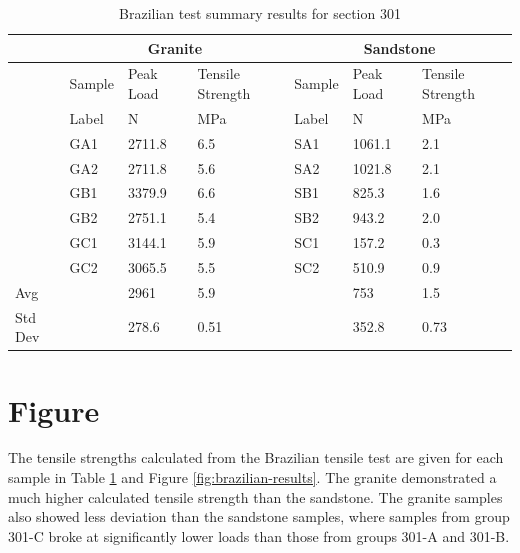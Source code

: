 \documentclass{article}
\begin{document}
\begin{table}[h]
\centering
\caption{Brazilian test summary results for section 301}
\label{tab:brazilian-results}
\begin{tabular}{lllllll}
\toprule
& \multicolumn{3}{c}{Granite}          & \multicolumn{3}{c}{Sandstone}         \\ \midrule
& Sample  & Peak Load & Tensile Strength & Sample  & Peak Load & Tensile Strength \\ 
& Label   & N         & MPa              & Label   & N         & MPa              \\ \midrule
& GA1     & 2711.8    & 6.5              & SA1     & 1061.1    & 2.1              \\ 
& GA2     & 2711.8    & 5.6              & SA2     & 1021.8    & 2.1              \\
& GB1     & 3379.9    & 6.6              & SB1     & 825.3     & 1.6              \\ 
& GB2     & 2751.1    & 5.4              & SB2     & 943.2     & 2.0              \\ 
& GC1     & 3144.1    & 5.9              & SC1     & 157.2     & 0.3              \\
& GC2     & 3065.5    & 5.5              & SC2     & 510.9     & 0.9              \\
Avg &     & 2961      & 5.9              &         & 753       & 1.5              \\
Std Dev & & 278.6     & 0.51             &         & 352.8     & 0.73             \\ \bottomrule
\end{tabular}
\end{table}

\section*{Figure}

The tensile strengths calculated from the Brazilian tensile test are given for each sample in Table \ref{tab:brazilian-results} and Figure \ref{fig:brazilian-results}. The granite demonstrated a much higher calculated tensile strength than the sandstone. The granite samples also showed less deviation than the sandstone samples, where samples from group 301-C broke at significantly lower loads than those from groups 301-A and 301-B.
\end{document}

